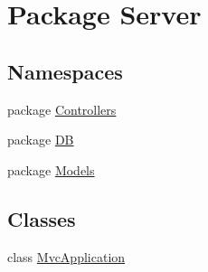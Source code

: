 \hypertarget{namespaceServer}{\section{Package Server}
\label{namespaceServer}
}
\subsection*{Namespaces}
\begin{DoxyCompactItemize}
\item 
package \hyperlink{namespaceServer_1_1Controllers}{Controllers}
\item 
package \hyperlink{namespaceServer_1_1DB}{D\-B}
\item 
package \hyperlink{namespaceServer_1_1Models}{Models}
\end{DoxyCompactItemize}
\subsection*{Classes}
\begin{DoxyCompactItemize}
\item 
class \hyperlink{classServer_1_1MvcApplication}{Mvc\-Application}
\end{DoxyCompactItemize}
